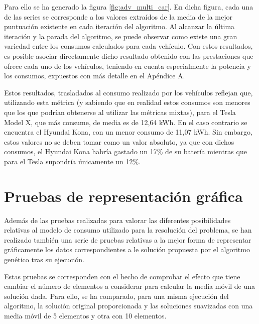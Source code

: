 \documentclass[11pt,spanish,listoffigures,listoftables]{tfgetsinf}
\begin{document}
Para ello se ha generado la figura \ref{fig:adv_multi_car}. En dicha figura, cada una de las series se corresponde a los valores extraídos de la media de la mejor puntuación existente en cada iteración del algoritmo. Al alcanzar la última iteración y la parada del algoritmo, se puede observar como existe una gran variedad entre los consumos calculados para cada vehículo. Con estos resultados, es posible asociar directamente dicho resultado obtenido con las prestaciones que ofrece cada uno de los vehículos, teniendo en cuenta especialmente la potencia y los consumos, expuestos con más detalle en el Apéndice A.

Estos resultados, trasladados al consumo realizado por los vehículos reflejan que, utilizando esta métrica (y sabiendo que en realidad estos consumos son menores que los que podrían obtenerse al utilizar las métricas mixtas), para el Tesla Model X, que más consume, de media es de 12,64 kWh. En el caso contrario se encuentra el Hyundai Kona, con un menor consumo de 11,07 kWh. Sin embargo, estos valores no se deben tomar como un valor absoluto, ya que con dichos consumos, el Hyundai Kona habría gastado un 17\% de su batería mientras que para el Tesla supondría únicamente un 12\%.

\newpage
\section{Pruebas de representación gráfica}
Además de las pruebas realizadas para valorar las diferentes posibilidades relativas al modelo de consumo utilizado para la resolución del problema, se han realizado también una serie de pruebas relativas a la mejor forma de representar gráficamente los datos correspondientes a le solución propuesta por el algoritmo genético tras su ejecución.

Estas pruebas se corresponden con el hecho de comprobar el efecto que tiene cambiar el número de elementos a considerar para calcular la media móvil de una solución dada. Para ello, se ha comparado, para una misma ejecución del algoritmo, la solución original proporcionada y las soluciones suavizadas con una media móvil de 5 elementos y otra con 10 elementos.
\end{document}
